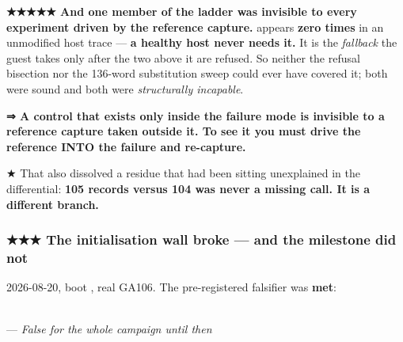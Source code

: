 \documentclass[10.5pt]{article}
\begin{document}
\begin{warnbox}\small
\textbf{★★★★★ And one member of the ladder was invisible to every experiment driven by the
reference capture.}  appears \textbf{zero times} in an unmodified host trace —
\textbf{a healthy host never needs it.} It is the \emph{fallback} the guest takes only after the
two above it are refused. So neither the refusal bisection nor the 136-word substitution sweep
could ever have covered it; both were sound and both were \emph{structurally incapable}.

\smallskip
\textbf{⇒ A control that exists only inside the failure mode is invisible to a reference capture
taken outside it. To see it you must drive the reference INTO the failure and re-capture.}

\smallskip
★ That also dissolved a residue that had been sitting unexplained in the differential:
\textbf{105 records versus 104 was never a missing call. It is a different branch.}
\end{warnbox}

\subsubsection*{★★★ The initialisation wall broke --- and the milestone did not}

\measured{} 2026-08-20, boot , real GA106. The pre-registered falsifier was
\textbf{met}:

\begin{center}\small
{} \quad {} \quad
{} \quad {} \\[2pt]
 \quad \textbf{} — \emph{False for the whole
campaign until then}
\end{center}
\end{document}
